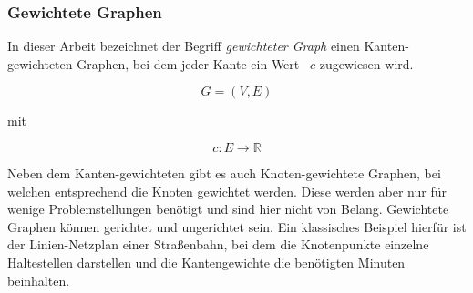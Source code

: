 \subsubsection{Gewichtete Graphen}
In dieser Arbeit bezeichnet der Begriff \textit{gewichteter Graph} einen Kanten-gewichteten Graphen, bei dem jeder Kante ein Wert ~$c$ zugewiesen wird.

$$G = (V,E)$$ 
\begin{center}
mit
\end{center}
$$c: E \rightarrow \mathbb{R}$$

Neben dem Kanten-gewichteten gibt es auch Knoten-gewichtete Graphen, bei welchen entsprechend die Knoten gewichtet werden. Diese werden aber nur für wenige Problemstellungen benötigt und sind hier nicht von Belang. Gewichtete Graphen können gerichtet und ungerichtet sein. Ein klassisches Beispiel hierfür ist der Linien-Netzplan einer Straßenbahn, bei dem die Knotenpunkte einzelne Haltestellen darstellen und die Kantengewichte die benötigten Minuten beinhalten.

